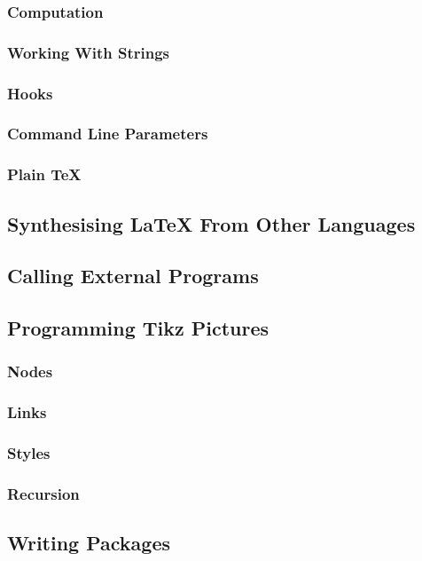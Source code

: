 \subsubsection{Computation}
\subsubsection{Working With Strings}
\subsubsection{Hooks}
\subsubsection{Command Line Parameters}
\subsubsection{Plain \TeX} \label{section:programming/advancedFeatures/plainTeX}


\subsection{Synthesising \LaTeX{} From Other Languages}


\subsection{Calling External Programs}


\subsection{Programming Tikz Pictures}
\subsubsection{Nodes}
\subsubsection{Links}
\subsubsection{Styles}
\subsubsection{Recursion}


\subsection{Writing Packages}


